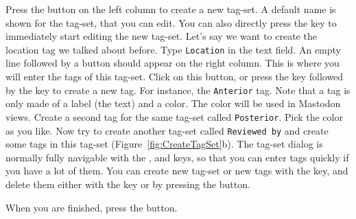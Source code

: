 Press the  button on the left column to create a new tag-set. 
A default name is shown for the tag-set, that you can edit.
You can also directly press the  \keys{\return} key to immediately start editing the new tag-set.
Let's say we want to create the location tag we talked about before.
Type \texttt{Location} in the text field. 
An empty line followed by a  button should appear on the right column.
This is where you will enter the tags of this tag-set.
Click on this button, or press the \keys{\tab} key followed by the \keys{\return} key to create a new tag.
For instance, the \texttt{Anterior} tag.
Note that a tag is only made of a label (the text) and a color.
The color will be used in Mastodon views.
Create a second tag for the same tag-set called \texttt{Posterior}.
Pick the color as you like. 
Now try to create another tag-set called \texttt{Reviewed by} and create some tags in this tag-set (Figure~\ref{fig:CreateTagSet}b). 
The tag-set dialog is normally fully navigable with the \keys{\tab}, \keys{\arrowkeyup} and \keys{\arrowkeydown} keys, so that you can enter tags quickly if you have a lot of them.
You can create new tag-set or new tags with the \keys{\return} key, and delete them either with the \keys{\del} key or by pressing the  button.

When you are finished, press the  button.


